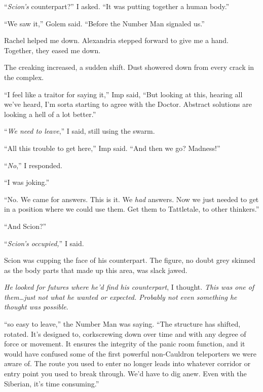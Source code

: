 ``\emph{Scion's} counterpart?'' I asked.  ``It was putting together a human body.''



``We saw it,'' Golem said.  ``Before the Number Man signaled us.''



Rachel helped me down.  Alexandria stepped forward to give me a hand.  Together, they eased me down.



The creaking increased, a sudden shift.  Dust showered down from every crack in the complex.



``I feel like a traitor for saying it,'' Imp said, ``But looking at this, hearing all we've heard, I'm sorta starting to agree with the Doctor.  Abstract solutions are looking a hell of a lot better.''



``\emph{We need to leave},'' I said, still using the swarm.



``All this trouble to get here,'' Imp said.  ``And then we go?  Madness!''



``\emph{No},'' I responded.



``I was joking.''



``No.  We came for answers.  This is it.  We \emph{had} answers.  Now we just needed to get in a position where we could use them.  Get them to Tattletale, to other thinkers.''



``And Scion?''



``\emph{Scion's occupied,}'' I said.



Scion was cupping the face of his counterpart.  The figure, no doubt grey skinned as the body parts that made up this area, was slack jawed.



\emph{He looked for futures where he'd find his counterpart}, I thought.  \emph{This was one of them\ldots just not what he wanted or expected.  Probably not even something he thought was possible}.



``\ldotsNot so easy to leave,'' the Number Man was saying.  ``The structure has shifted, rotated.  It's designed to, corkscrewing down over time and with any degree of force or movement.  It ensures the integrity of the panic room function, and it would have confused some of the first powerful non-Cauldron teleporters we were aware of.  The route you used to enter no longer leads into whatever corridor or entry point you used to break through.  We'd have to dig anew.  Even with the Siberian, it's time consuming.''



